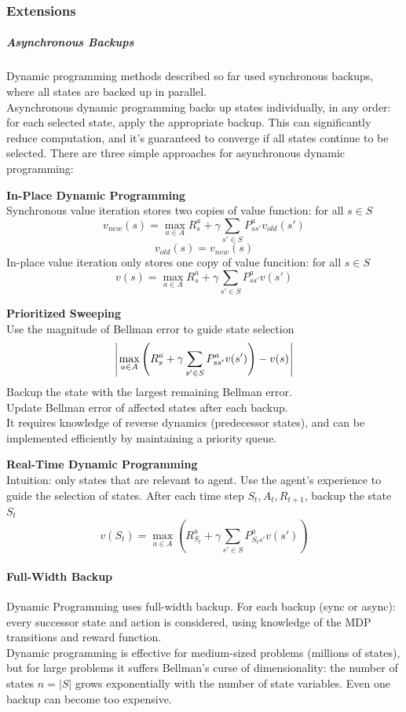 \documentclass[10pt]{report}
\begin{document}
\subsubsection{Extensions}
\subparagraph{Asynchronous Backups} Dynamic programming methods described so far used synchronous backups, where all states are backed up in parallel.\\
Asynchronous dynamic programming backs up states individually, in any order: for each selected state, apply the appropriate backup. This can significantly reduce computation, and it's guaranteed to converge if all states continue to be selected. There are three simple approaches for asynchronous dynamic programming:
\begin{list}{}{}
	\item \textbf{In-Place Dynamic Programming}\\
	Synchronous value iteration stores two copies of value function: for all $s\in S$ $$v_{new}(s) = \max_{a\in A}R_s^a+\gamma\sum_{s'\in S}P_{ss'}^av_{old}(s')$$
	$$v_{old}(s) = v_{new}(s)$$
	In-place value iteration only stores one copy of value funcition: for all $s\in S$ $$v(s) = \max_{a\in A}R_s^a+\gamma\sum_{s'\in S}P_{ss'}^av(s')$$
	\item \textbf{Prioritized Sweeping}\\
	Use the magnitude of Bellman error to guide state selection
	$$\vline\:\max_{a\in A}\left(R_s^a+\gamma\sum_{s'\in S}P_{ss'}^av(s')\right)-v(s)\:\vline$$
	Backup the state with the largest remaining Bellman error.\\
	Update Bellman error of affected states after each backup.\\
	It requires knowledge of reverse dynamics (predecessor states), and can be implemented efficiently by maintaining a priority queue.
	\item \textbf{Real-Time Dynamic Programming}\\
	Intuition: only states that are relevant to agent. Use the agent's experience to guide the selection of states. After each time step $S_t,A_t,R_{t+1}$, backup the state $S_t$
	$$v(S_t) = \max_{a\in A}\left(R_{S_t}^a+\gamma\sum_{s'\in S}P_{S_ts'}^av(s')\right)$$
\end{list}
\paragraph{Full-Width Backup} Dynamic Programming uses full-width backup. For each backup (sync or async): every successor state and action is considered, using knowledge of the MDP transitions and reward function.\\
Dynamic programming is effective for medium-sized problems (millions of states), but for large problems it suffers Bellman's curse of dimensionality: the number of states $n = |S|$ grows exponentially with the number of state variables. Even one backup can become too expensive.
\end{document}
